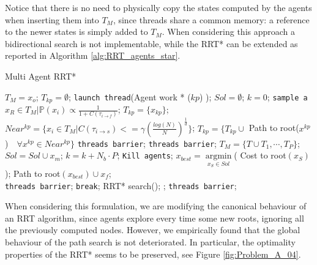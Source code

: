 Notice that there is no need to physically copy the states computed by the agents when inserting them into $T_M$, since threads share a common memory: a reference to the newer states is simply added to $T_M$. When considering this approach a bidirectional search is not implementable, while the RRT* can be extended as reported in Algorithm \ref{alg:RRT_agents_star}.


\begin{algorithm}
\caption{Multi Agent RRT*}\label{alg:RRT_agents_star}
\begin{algorithmic}[1]
\State $T_M={x_o}$; 
\State $T_{kp} = \emptyset$;
\State \texttt{launch thread}(Agent work * ($kp$) );
\EndFor
\State $Sol = \emptyset$;
\State $k=0$;
	\State \texttt{sample a} $x_R \in T_M \vert \mathbb{P}(x_i) \propto \frac{1}{1+C(\tau_{i \rightarrow f})}$;
	\State $T_{kp} = \lbrace x_{kp} \rbrace$;
	\State $Near^{kp}=\lbrace x_i \in T_M | C(\tau_{i \rightarrow s}) <= \gamma {(\frac{log(N)}{N})}^{\frac{1}{d}}  \rbrace$;
	\State $T_{kp}=\lbrace T_{kp} \cup$ Path to root($x^{kp}$) $ \,\,\,\, \forall x^{kp} \in Near^{kp} \rbrace$
	\EndFor
	\State \texttt{threads barrier};
	\State \texttt{threads barrier};
	\State $T_M = \lbrace T \cup T_1, \cdots, T_P \rbrace$;
		\State $Sol = Sol \cup x_m$;	
	\EndFor
	\State $k=k+N_b \cdot P$;
\EndWhile
	\State \texttt{Kill agents};
	\State $x_{best} = \underset{x_S \in Sol}{\operatorname{argmin}}$( Cost to root$(x_S)$ );
	\State \Return Path to root$(x_{best}) \cup x_f$;
\EndProcedure
\\
	\State \texttt{threads barrier};
	\State \texttt{break};
	\EndIf
\State RRT* search(); ;
	\State \texttt{threads barrier};
\EndWhile
\EndProcedure
\end{algorithmic}
\end{algorithm}

When considering this formulation, we are modifying the canonical behaviour of an RRT algorithm, since agents explore every time some new roots, ignoring all the previously computed nodes. However, we empirically found that the global behaviour of the path search is not deteriorated. In particular, the optimality properties of the RRT* seems to be preserved, see Figure \ref{fig:Problem_A_04}.

